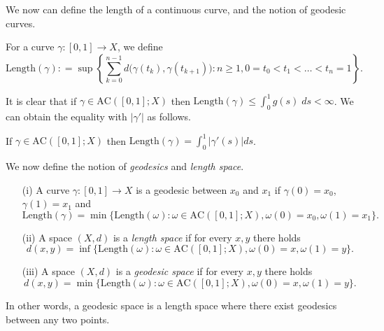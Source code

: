 We now can define the length of a continuous curve, and the notion of geodesic curves.

\begin{defn}[Length] For a curve $\gamma:[0,1]\to X$, we define
\begin{equation*}
    \mathrm{Length}(\gamma): = \sup \left\lbrace \sum_{k=0}^{n-1}d\big(\gamma(t_k), \gamma(t_{k+1})\big): n\geq 1, 0=t_0<t_1<\ldots < t_n = 1 \right\rbrace.
\end{equation*}
\end{defn}

It is clear that if $\gamma\in \mathrm{AC}([0,1];X)$ then $\mathrm{Length}(\gamma) \leq \int_0^1 g(s)\;ds < \infty$. We can obtain the equality with $|\gamma'|$ as follows.

\begin{thm} If $\gamma\in \mathrm{AC}([0,1];X)$ then $\mathrm{Length}(\gamma) = \int_0^1 |\gamma'(s)|ds$.
\end{thm}

We now define the notion of \emph{geodesics} and \emph{length space}.
\begin{defn} \quad 
\begin{itemize}
    \item[(i)] A curve $\gamma:[0,1]\to X$ is a geodesic between $x_0$ and $x_1$ if $\gamma(0) = x_0$, $\gamma(1) = x_1$ and 
    \begin{equation*}
        \mathrm{Length}(\gamma) = \min \big\lbrace \mathrm{Length}(\omega): \omega\in \mathrm{AC}([0,1];X), \omega(0)=x_0, \omega(1)=x_1\big\rbrace.
    \end{equation*}
    \item[(ii)] A space $(X,d)$ is a \emph{length space} if for every $x,y$ there holds
    \begin{equation*}
        d(x,y) = \inf \big\lbrace\mathrm{Length}(\omega): \omega\in \mathrm{AC}([0,1];X), \omega(0)=x, \omega(1)=y \big\rbrace.
    \end{equation*}
    \item[(iii)] A space $(X,d)$  is a \emph{geodesic space} if for every $x,y$ there holds
    \begin{equation*}
        d(x,y) = \min \big\lbrace\mathrm{Length}(\omega): \omega\in \mathrm{AC}([0,1];X), \omega(0)=x, \omega(1)=y \big\rbrace.
    \end{equation*}
\end{itemize}
In other words, a geodesic space is a length space where there exist geodesics between any two points.
\end{defn}

